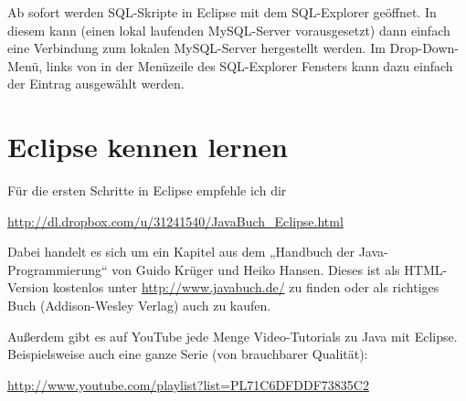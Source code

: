 Ab sofort werden SQL-Skripte in Eclipse mit dem SQL-Explorer geöffnet. In diesem
kann (einen lokal laufenden MySQL-Server vorausgesetzt)  dann einfach eine
Verbindung zum lokalen MySQL-Server hergestellt werden. Im Drop-Down-Menü,
links von  in der Menüzeile des SQL-Explorer Fensters kann
dazu einfach der Eintrag  ausgewählt werden.



\section{Eclipse kennen lernen}

Für die ersten Schritte in Eclipse empfehle ich dir

\url{http://dl.dropbox.com/u/31241540/JavaBuch_Eclipse.html} 

Dabei handelt es sich um ein Kapitel aus dem „Handbuch der Java-Programmierung“
von Guido Krüger und Heiko Hansen. Dieses ist als HTML-Version kostenlos unter
\url{http://www.javabuch.de/} zu finden oder als richtiges Buch (Addison-Wesley
Verlag) auch zu kaufen.

\begin{minipage}{\textwidth}
Außerdem gibt es auf YouTube jede Menge Video-Tutorials zu Java mit Eclipse.
Beispielsweise auch eine ganze Serie (von brauchbarer Qualität):

\url{http://www.youtube.com/playlist?list=PL71C6DFDDF73835C2}
\end{minipage}
